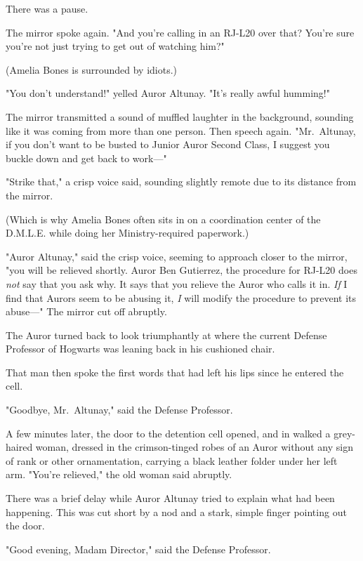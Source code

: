 There was a pause.

The mirror spoke again. "And you're calling in an RJ-L20 over that? You're sure 
you're not just trying to get out of watching him?"

(Amelia Bones is surrounded by idiots.)

"You don't understand!" yelled Auror Altunay. "It's really awful humming!"

The mirror transmitted a sound of muffled laughter in the background, sounding 
like it was coming from more than one person. Then speech again. "Mr.~Altunay, 
if you don't want to be busted to Junior Auror Second Class, I suggest you 
buckle down and get back to work---"

"Strike that," a crisp voice said, sounding slightly remote due to its distance 
from the mirror.

(Which is why Amelia Bones often sits in on a coordination center of the 
D.M.L.E. while doing her Ministry-required paperwork.)

"Auror Altunay," said the crisp voice, seeming to approach closer to the 
mirror, "you will be relieved shortly. Auror Ben Gutierrez, the procedure for 
RJ-L20 does \emph{not} say that you ask why. It says that you relieve the Auror 
who calls it in. \emph{If} I find that Aurors seem to be abusing it, \emph{I} 
will modify the procedure to prevent its abuse---" The mirror cut off abruptly.

The Auror turned back to look triumphantly at where the current Defense 
Professor of Hogwarts was leaning back in his cushioned chair.

That man then spoke the first words that had left his lips since he entered the 
cell.

"Goodbye, Mr.~Altunay," said the Defense Professor.

A few minutes later, the door to the detention cell opened, and in walked a 
grey-haired woman, dressed in the crimson-tinged robes of an Auror without any 
sign of rank or other ornamentation, carrying a black leather folder under her 
left arm. "You're relieved," the old woman said abruptly.

There was a brief delay while Auror Altunay tried to explain what had been 
happening. This was cut short by a nod and a stark, simple finger pointing out 
the door.

"Good evening, Madam Director," said the Defense Professor.

